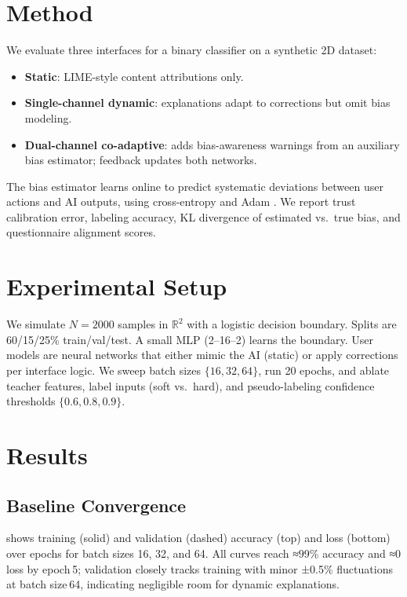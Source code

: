 \documentclass{article} %
\begin{document}
\section{Method}
We evaluate three interfaces for a binary classifier on a synthetic 2D dataset:
\begin{itemize}
  \item \textbf{Static}: LIME-style content attributions only.
  \item \textbf{Single-channel dynamic}: explanations adapt to corrections but omit bias modeling.
  \item \textbf{Dual-channel co-adaptive}: adds bias-awareness warnings from an auxiliary bias estimator; feedback updates both networks.
\end{itemize}
The bias estimator learns online to predict systematic deviations between user actions and AI outputs, using cross-entropy and Adam \citep{kingma2014adamam}. We report trust calibration error, labeling accuracy, KL divergence of estimated vs.~true bias, and questionnaire alignment scores.

\section{Experimental Setup}
We simulate $N=2000$ samples in $\mathbb R^2$ with a logistic decision boundary. Splits are 60/15/25\% train/val/test. A small MLP (2–16–2) learns the boundary. User models are neural networks that either mimic the AI (static) or apply corrections per interface logic. We sweep batch sizes $\{16,32,64\}$, run 20 epochs, and ablate teacher features, label inputs (soft vs.~hard), and pseudo-labeling confidence thresholds $\{0.6,0.8,0.9\}$.

\section{Results}
\subsection{Baseline Convergence}
 shows training (solid) and validation (dashed) accuracy (top) and loss (bottom) over epochs for batch sizes 16, 32, and 64. All curves reach ≈99\% accuracy and ≈0 loss by epoch 5; validation closely tracks training with minor ±0.5\% fluctuations at batch size 64, indicating negligible room for dynamic explanations.
\end{document}
